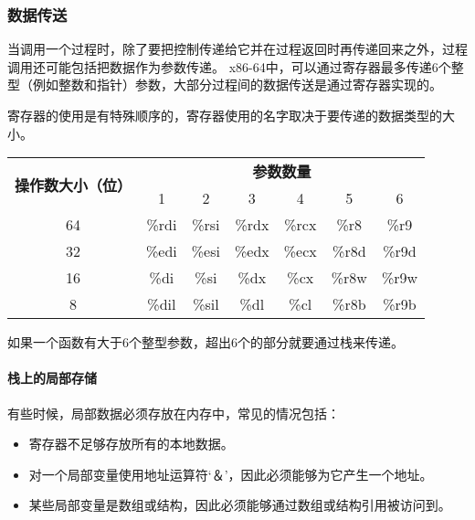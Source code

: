 \subsubsection{数据传送}

当调用一个过程时，除了要把控制传递给它并在过程返回时再传递回来之外，过程调用还可能包括把数据作为参数传递。
x86-64中，可以通过寄存器最多传递6个整型（例如整数和指针）参数，大部分过程间的数据传送是通过寄存器实现的。

寄存器的使用是有特殊顺序的，寄存器使用的名字取决于要传递的数据类型的大小。

\begin{table}[H]
    \centering
    \begin{tabular}{|c|c|c|c|c|c|c|}
        \hline
        \multirow{2}{*}{\textbf{操作数大小（位）}} & \multicolumn{6}{c|}{\textbf{参数数量}}                                         \\
        \cline{2-7}
                                           & 1                                  & 2     & 3     & 4     & 5     & 6     \\
        \hline
        64                                 & \%rdi                              & \%rsi & \%rdx & \%rcx & \%r8  & \%r9  \\
        \hline
        32                                 & \%edi                              & \%esi & \%edx & \%ecx & \%r8d & \%r9d \\
        \hline
        16                                 & \%di                               & \%si  & \%dx  & \%cx  & \%r8w & \%r9w \\
        \hline
        8                                  & \%dil                              & \%sil & \%dl  & \%cl  & \%r8b & \%r9b \\
        \hline
    \end{tabular}
\end{table}

如果一个函数有大于6个整型参数，超出6个的部分就要通过栈来传递。

\paragraph{栈上的局部存储}

有些时候，局部数据必须存放在内存中，常见的情况包括：
\begin{itemize}
    \item 寄存器不足够存放所有的本地数据。
    \item 对一个局部变量使用地址运算符‘＆’，因此必须能够为它产生一个地址。
    \item 某些局部变量是数组或结构，因此必须能够通过数组或结构引用被访问到。
\end{itemize}

